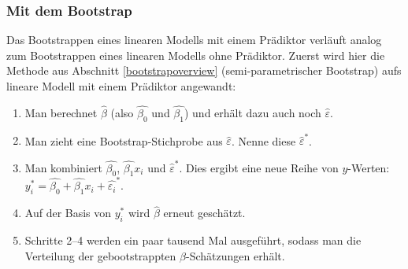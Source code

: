 \documentclass[oneside, 10pt]{book}\usepackage[]{graphicx}\usepackage[]{xcolor}
\begin{document}
\subsubsection{Mit dem Bootstrap}
Das Bootstrappen eines linearen Modells mit einem Prädiktor
verläuft analog zum Bootstrappen eines linearen Modells ohne Prädiktor.
Zuerst wird hier die Methode aus Abschnitt \ref{bootstrapoverview}
(semi-parametrischer Bootstrap)
aufs lineare Modell mit einem Prädiktor angewandt:
\begin{enumerate}\label{nonparametricbsregression}
 \item Man berechnet $\widehat{\beta}$ (also $\widehat{\beta_0}$ und $\widehat{\beta_1}$) und erhält dazu auch noch $\widehat{\varepsilon}$.
 \item Man zieht eine Bootstrap-Stichprobe aus $\widehat{\varepsilon}$.
 Nenne diese $\widehat{\varepsilon}^{*}$.
 \item Man kombiniert $\widehat{\beta_0}$, $\widehat{\beta_1}x_i$  und $\widehat{\varepsilon}^{*}$. Dies ergibt
 eine neue Reihe von $y$-Werten: $y_i^{*} = \widehat{\beta_0} + \widehat{\beta_1}x_i + \widehat{\varepsilon_i}^{*}$.
 \item Auf der Basis von $y_i^{*}$ wird $\widehat{\beta}$ erneut geschätzt.
 \item Schritte 2--4 werden ein paar tausend Mal ausgeführt, sodass man die Verteilung der gebootstrappten $\beta$-Schätzungen erhält.
\end{enumerate}
\end{document}
